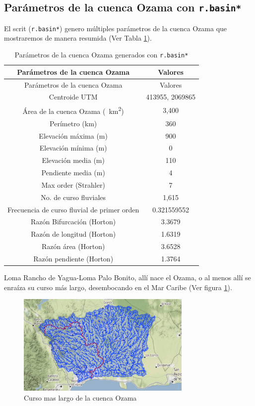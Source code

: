 \documentclass[11pt,]{article}
\begin{document}
\newpage

\subsection{\texorpdfstring{Parámetros de la cuenca Ozama con
\texttt{r.basin*}}{Parámetros de la cuenca Ozama con r.basin*}}\label{paruxe1metros-de-la-cuenca-ozama-con-r.basin}

El scrit (\texttt{r.basin*}) genero múltiples parámetros de la cuenca
Ozama que mostraremos de manera resumida (Ver Tabla \ref{tab:tabla2}).

\begin{longtable}[]{@{}cc@{}}
\caption{Parámetros de la cuenca Ozama generados con
\texttt{r.basin*}\label{tab:tabla2}}\tabularnewline
\toprule
Parámetros de la cuenca Ozama & Valores\tabularnewline
\midrule
\endfirsthead
\toprule
Parámetros de la cuenca Ozama & Valores\tabularnewline
\midrule
\endhead
Centroide UTM & 413955, 2069865\tabularnewline
Área de la cuenca Ozama (~km\textsuperscript{2}) & 3,400\tabularnewline
Perímetro (km) & 360\tabularnewline
Elevación máxima (m) & 900\tabularnewline
Elevación mínima (m) & 0\tabularnewline
Elevación media (m) & 110\tabularnewline
Pendiente media (m) & 4\tabularnewline
Max order (Strahler) & 7\tabularnewline
No. de curso fluviales & 1,615\tabularnewline
Frecuencia de curso fluvial de primer orden & 0.321559552\tabularnewline
Razón Bifurcación (Horton) & 3.3679\tabularnewline
Razón de longitud (Horton) & 1.6319\tabularnewline
Razón área (Horton) & 3.6528\tabularnewline
Razón pendiente (Horton) & 1.3764\tabularnewline
\bottomrule
\end{longtable}

Loma Rancho de Yagua-Loma Palo Bonito, allí nace el Ozama, o al menos
allí se enraíza su curso más largo, desembocando en el Mar Caribe (Ver
figura \ref{fig:c_m_l}).

\begin{figure}
\centering
\includegraphics[width=0.75000\textwidth]{Productos Generados/curso mas largo.png}
\caption{\label{fig:c_m_l} Curso mas largo de la cuenca Ozama}
\end{figure}
\end{document}
